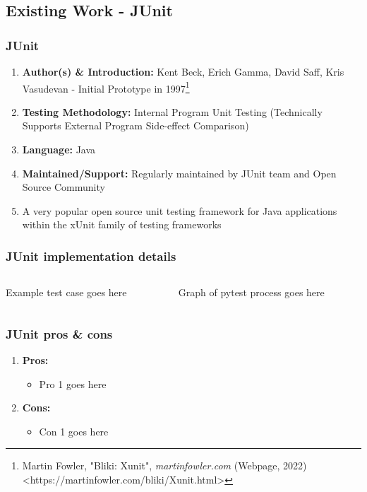 \documentclass[xcolor]{beamer}
\begin{document}
\subsection{Existing Work - JUnit}
\begin{frame}
	\frametitle{JUnit}
	\begin{enumerate}
		\setlength\itemsep{1em}
		\item \textbf{Author(s) \& Introduction:} Kent Beck, Erich Gamma, David Saff, Kris Vasudevan - Initial Prototype in 1997\footnote{Martin Fowler, "Bliki: Xunit", \textit{martinfowler.com} (Webpage, 2022) <https://martinfowler.com/bliki/Xunit.html>}
			\pause
		\item \textbf{Testing Methodology:} Internal Program Unit Testing (Technically Supports External Program Side-effect Comparison)
			\pause
		\item \textbf{Language:} Java
			\pause
		\item \textbf{Maintained/Support:} Regularly maintained by JUnit team and Open Source Community
			\pause 
		\item A very popular open source unit testing framework for Java applications within the xUnit family of testing frameworks
	\end{enumerate}
\end{frame}
\begin{frame}
	\frametitle{JUnit implementation details}
	\begin{columns}
		\begin{column}{0.45\textwidth}
			Example test case goes here
		\end{column}
		\begin{column}{0.45\textwidth}
			Graph of pytest process goes here
		\end{column}
	\end{columns}
\end{frame}
\begin{frame}
	\frametitle{JUnit pros \& cons}
	\begin{enumerate}
		\item \textbf{Pros:}
		\begin{itemize}
			\item Pro 1 goes here
		\end{itemize}
			\pause
		\item \textbf{Cons:}
		\begin{itemize}
			\item Con 1 goes here
		\end{itemize}
	\end{enumerate}
\end{frame}
\end{document}
